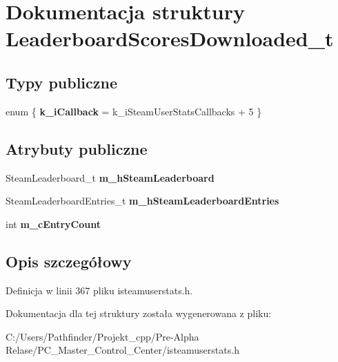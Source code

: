\hypertarget{struct_leaderboard_scores_downloaded__t}{}\section{Dokumentacja struktury Leaderboard\+Scores\+Downloaded\+\_\+t}
\label{struct_leaderboard_scores_downloaded__t}
\subsection*{Typy publiczne}
\begin{DoxyCompactItemize}
\item 
\mbox{\label{struct_leaderboard_scores_downloaded__t_af0a4694b89f479c99b31518cba445814}} 
enum \{ {\bfseries k\+\_\+i\+Callback} = k\+\_\+i\+Steam\+User\+Stats\+Callbacks + 5
 \}
\end{DoxyCompactItemize}
\subsection*{Atrybuty publiczne}
\begin{DoxyCompactItemize}
\item 
\mbox{\label{struct_leaderboard_scores_downloaded__t_a19677073d79576524a1f9fba5ba07af7}} 
Steam\+Leaderboard\+\_\+t {\bfseries m\+\_\+h\+Steam\+Leaderboard}
\item 
\mbox{\label{struct_leaderboard_scores_downloaded__t_ad3e5ed2be7790d1b97c2f99dd3a5643a}} 
Steam\+Leaderboard\+Entries\+\_\+t {\bfseries m\+\_\+h\+Steam\+Leaderboard\+Entries}
\item 
\mbox{\label{struct_leaderboard_scores_downloaded__t_ac6a9ac2e82319bb1a331254e3157ceeb}} 
int {\bfseries m\+\_\+c\+Entry\+Count}
\end{DoxyCompactItemize}


\subsection{Opis szczegółowy}


Definicja w linii 367 pliku isteamuserstats.\+h.



Dokumentacja dla tej struktury została wygenerowana z pliku\+:\begin{DoxyCompactItemize}
\item 
C\+:/\+Users/\+Pathfinder/\+Projekt\+\_\+cpp/\+Pre-\/\+Alpha Relase/\+P\+C\+\_\+\+Master\+\_\+\+Control\+\_\+\+Center/isteamuserstats.\+h\end{DoxyCompactItemize}
